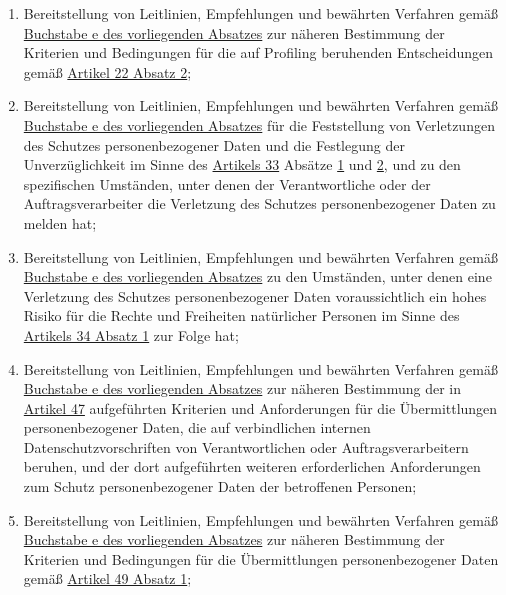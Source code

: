 \begin{enumerate}
\begin{enumerate}
    \item Bereitstellung von Leitlinien, Empfehlungen und bewährten Verfahren gemäß \hyperref[itm:70-1e]{Buchstabe e des
     vorliegenden Absatzes} zur näheren Bestimmung der Kriterien und Bedingungen für die auf Profiling beruhenden
     Entscheidungen gemäß \hyperref[itm:22-2]{Artikel 22 Absatz 2};
    \label{itm:70-1f}

    \item Bereitstellung von Leitlinien, Empfehlungen und bewährten Verfahren gemäß \hyperref[itm:70-1e]{Buchstabe e des
     vorliegenden Absatzes} für die Feststellung von Verletzungen des Schutzes personenbezogener Daten und die
     Festlegung der Unverzüglichkeit im Sinne des \hyperref[ch:33]{Artikels 33} Absätze \hyperref[itm:33-1]{1} und
     \hyperref[itm:33-2]{2}, und zu den spezifischen Umständen, unter denen der Verantwortliche oder der
     Auftragsverarbeiter die Verletzung des Schutzes personenbezogener Daten zu melden hat;
    \label{itm:70-1g}

    \item Bereitstellung von Leitlinien, Empfehlungen und bewährten Verfahren gemäß \hyperref[itm:70-1e]{Buchstabe e des
     vorliegenden Absatzes} zu den Umständen, unter denen eine Verletzung des Schutzes personenbezogener Daten
     voraussichtlich ein hohes Risiko für die Rechte und Freiheiten natürlicher Personen im Sinne des \hyperref
     [itm:34-1]{Artikels 34 Absatz 1} zur Folge hat;
    \label{itm:70-1h}

    \item Bereitstellung von Leitlinien, Empfehlungen und bewährten Verfahren gemäß \hyperref[itm:70-1e]{Buchstabe e des
     vorliegenden Absatzes} zur näheren Bestimmung der in \hyperref[ch:47]{Artikel 47} aufgeführten Kriterien und
     Anforderungen für die Übermittlungen personenbezogener Daten, die auf verbindlichen internen
     Datenschutzvorschriften von Verantwortlichen oder Auftragsverarbeitern beruhen, und der dort aufgeführten weiteren
     erforderlichen Anforderungen zum Schutz personenbezogener Daten der betroffenen Personen;
    \label{itm:70-1i}

    \item Bereitstellung von Leitlinien, Empfehlungen und bewährten Verfahren gemäß \hyperref[itm:70-1e]{Buchstabe e des
     vorliegenden Absatzes} zur näheren Bestimmung der Kriterien und Bedingungen für die Übermittlungen
     personenbezogener Daten gemäß \hyperref[itm:49-1-1]{Artikel 49 Absatz 1};
    \label{itm:70-1j}


\end{enumerate}
\end{enumerate}
